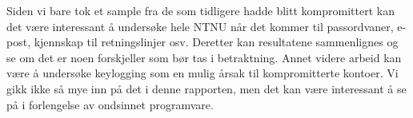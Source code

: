 Siden vi bare tok et sample fra de som tidligere hadde blitt kompromittert kan det være interessant å undersøke hele NTNU når det kommer til passordvaner, e-post, kjennskap til retningslinjer osv. Deretter kan resultatene sammenlignes og se om det er noen forskjeller som bør tas i betraktning. Annet videre arbeid kan være å undersøke keylogging som en mulig årsak til kompromitterte kontoer. Vi gikk ikke så mye inn på det i denne rapporten, men det kan være interessant å se på i forlengelse av ondsinnet programvare. 
